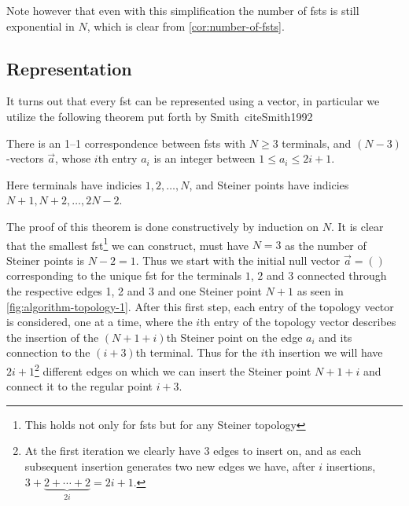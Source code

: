Note however that even with this simplification the number of \glspl{fst} is
still exponential in $N$, which is clear from \cref{cor:number-of-fsts}.

\subsection{Representation}
\label{sec:representation}

It turns out that every \gls{fst} can be represented using a vector, in
particular we utilize the following theorem put forth by Smith~cite{Smith1992}

\begin{theorem}
  There is an 1--1 correspondence between \glspl{fst} with $N \ge 3$ terminals,
  and $(N-3)$-vectors $\vec{a}$, whose $i$th entry $a_i$ is an integer between
  $1 \le a_i \le 2 i + 1$.
\end{theorem}

Here terminals have indicies $1, 2, \ldots, N$, and Steiner points have indicies
$N+1, N+2, \ldots, 2N-2$.

The proof of this theorem is done constructively by induction on $N$.  It is
clear that the smallest \gls{fst}\footnote{This holds not only for \glspl{fst}
  but for any Steiner topology} we can construct, must have $N = 3$ as the
number of Steiner points is $N - 2 = 1$.  Thus we start with the initial null
vector $\vec{a} = ()$ corresponding to the unique \gls{fst} for the terminals
$1$, $2$ and $3$ connected through the respective edges 1, 2 and 3 and one
Steiner point $N+1$ as seen in \cref{fig:algorithm-topology-1}.  After this
first step, each entry of the topology vector is considered, one at a time,
where the $i$th entry of the topology vector describes the insertion of the
$(N+1+i)$th Steiner point on the edge $a_{i}$ and its connection to the
$(i+3)$th terminal.  Thus for the $i$th insertion we will have
$2i+1$\footnote{At the first iteration we clearly have 3 edges to insert on, and
  as each subsequent insertion generates two new edges we have, after $i$
  insertions, $3 + \underbrace{2 + \cdots + 2}_{2 i} = 2 i + 1$.} different
edges on which we can insert the Steiner point $N+1+i$ and connect it to the
regular point $i+3$.

